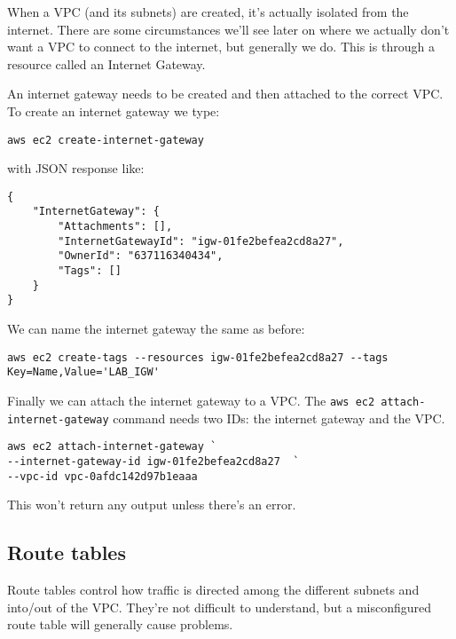 \documentclass{pgnotes}
\begin{document}
When a VPC (and its subnets) are created, it's actually isolated from the internet.
There are some circumstances we'll see later on where we actually don't want a VPC to connect to the internet, but generally we do.
This is through a resource called an Internet Gateway.

An internet gateway needs to be created and then attached to the correct VPC.
To create an internet gateway we type:
\begin{verbatim}
aws ec2 create-internet-gateway
\end{verbatim}
with JSON response like:
\begin{verbatim}
{
    "InternetGateway": {
        "Attachments": [],
        "InternetGatewayId": "igw-01fe2befea2cd8a27",
        "OwnerId": "637116340434",
        "Tags": []
    }
}
\end{verbatim}
We can name the internet gateway the same as before:
\begin{verbatim}
aws ec2 create-tags --resources igw-01fe2befea2cd8a27 --tags Key=Name,Value='LAB_IGW'
\end{verbatim}
Finally we can attach the internet gateway to a VPC.
The \texttt{aws ec2 attach-internet-gateway} command needs two IDs: the internet gateway and the VPC.
\begin{verbatim}
aws ec2 attach-internet-gateway `
--internet-gateway-id igw-01fe2befea2cd8a27  `
--vpc-id vpc-0afdc142d97b1eaaa
\end{verbatim}
This won't return any output unless there's an error.

\subsection{Route tables}

Route tables control how traffic is directed among the different subnets and into/out of the VPC.
They're not difficult to understand, but a misconfigured route table will generally cause problems.
\end{document}
